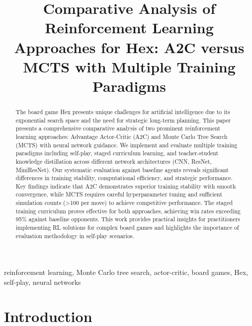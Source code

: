 \documentclass[conference]{IEEEtran}
\begin{document}
\title{Comparative Analysis of Reinforcement Learning Approaches for Hex: A2C versus MCTS with Multiple Training Paradigms}

\author{
}

\maketitle

\begin{abstract}
The board game Hex presents unique challenges for artificial intelligence due to its exponential search space and the need for strategic long-term planning. This paper presents a comprehensive comparative analysis of two prominent reinforcement learning approaches: Advantage Actor-Critic (A2C) and Monte Carlo Tree Search (MCTS) with neural network guidance. We implement and evaluate multiple training paradigms including self-play, staged curriculum learning, and teacher-student knowledge distillation across different network architectures (CNN, ResNet, MiniResNet). Our systematic evaluation against baseline agents reveals significant differences in training stability, computational efficiency, and strategic performance. Key findings indicate that A2C demonstrates superior training stability with smooth convergence, while MCTS requires careful hyperparameter tuning and sufficient simulation counts (>100 per move) to achieve competitive performance. The staged training curriculum proves effective for both approaches, achieving win rates exceeding 95\% against baseline opponents. This work provides practical insights for practitioners implementing RL solutions for complex board games and highlights the importance of evaluation methodology in self-play scenarios.
\end{abstract}

\begin{IEEEkeywords}
reinforcement learning, Monte Carlo tree search, actor-critic, board games, Hex, self-play, neural networks
\end{IEEEkeywords}

\section{Introduction}
\end{document}
